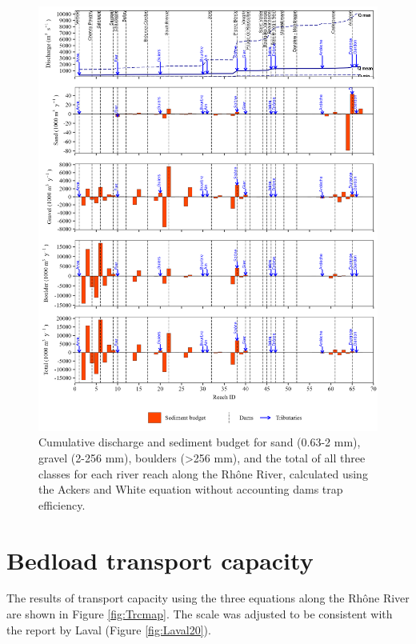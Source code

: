 \documentclass[
]{book}
\begin{document}
\begin{figure}
\includegraphics[width=26.24in]{img/res_cascade/res_E2_eA&W/plots_sed_budget-silt/sed_bud_res_sum_hy_E2_eA&W} \caption{Cumulative discharge and sediment budget for sand (0.63-2 mm), gravel (2-256 mm), boulders (>256 mm), and the total of all three classes for each river reach along the Rhône River, calculated using the Ackers and White equation without accounting dams trap efficiency.}\label{fig:budgetE2eA}
\end{figure}

\section{Bedload transport capacity}\label{bedload-transport-capacity}

The results of transport capacity using the three equations along the Rhône River are shown in Figure \ref{fig:Trcmap}. The scale was adjusted to be consistent with the report by Laval \citeyearpar{Laval20} (Figure \ref{fig:Laval20}).
\end{document}
